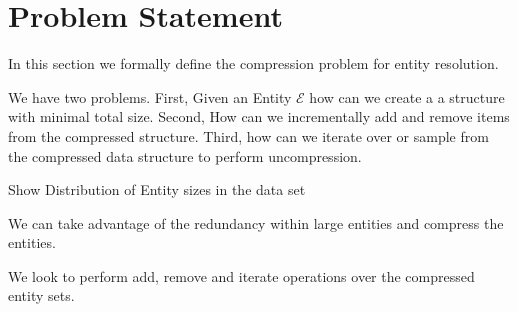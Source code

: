 
\section{Problem Statement}

In this section we formally define the compression problem for
entity resolution.

We have two problems.
First, Given an Entity $\mathcal{E}$ how can we create a
a structure with minimal total size.
Second, How can we incrementally add and remove items 
from the compressed structure.
Third, how can we iterate over or sample from the
compressed data structure to perform uncompression.




Show Distribution of Entity sizes in the data set

We can take advantage of the redundancy within
large entities and compress the entities.

We look to perform add, remove and iterate operations
over the compressed entity sets.  




